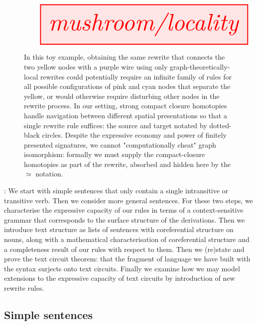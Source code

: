 \begin{figure}[h!]\label{fig:locality}
\centering
\[
\resizebox{\textwidth}{!}{\tikzfig{mushroom/locality}}
\]
\caption{In this toy example, obtaining the same rewrite that connects the two yellow nodes with a purple wire using only graph-theoretically-local rewrites could potentially require an infinite family of rules for all possible configurations of pink and cyan nodes that separate the yellow, or would otherwise require disturbing other nodes in the rewrite process. In our setting, strong compact closure homotopies handle navigation between different spatial presentations so that a single rewrite rule suffices: the source and target notated by dotted-black circles. Despite the expressive economy and power of finitely presented signatures, we cannot "computationally cheat" graph isomorphism: formally we must supply the compact-closure homotopies as part of the rewrite, absorbed and hidden here by the $\simeq$ notation.}
\end{figure}

: We start with simple sentences that only contain a single intransitive or transitive verb. Then we consider more general sentences. For these two steps, we characterise the expressive capacity of our rules in terms of a context-sensitive grammar that corresponds to the surface structure of the derivations. Then we introduce text structure as lists of sentences with coreferential structure on nouns, along with a mathematical characterisation of coreferential structure and a completeness result of our rules with respect to them. Then we (re)state and prove the text circuit theorem: that the fragment of language we have built with the syntax surjects onto text circuits. Finally we examine how we may model extensions to the expressive capacity of text circuits by introduction of new rewrite rules.

\clearpage

\subsection{Simple sentences}



